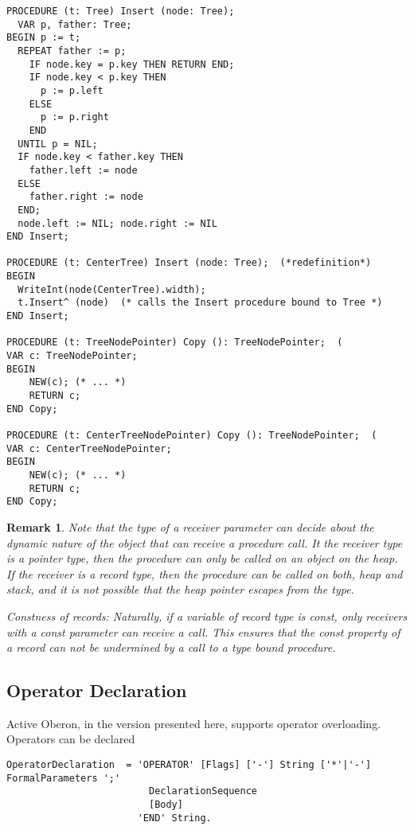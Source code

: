 \documentclass[a4wide,11pt]{article}
\newtheorem{remark}{Remark}
\begin{document}
\begin{annotation}
\begin{lstlisting}[style=example]
PROCEDURE (t: Tree) Insert (node: Tree);
  VAR p, father: Tree;
BEGIN p := t;
  REPEAT father := p;
    IF node.key = p.key THEN RETURN END;
    IF node.key < p.key THEN
      p := p.left
    ELSE
      p := p.right
    END
  UNTIL p = NIL;
  IF node.key < father.key THEN
    father.left := node
  ELSE
    father.right := node
  END;
  node.left := NIL; node.right := NIL
END Insert;

PROCEDURE (t: CenterTree) Insert (node: Tree);  (*redefinition*)
BEGIN
  WriteInt(node(CenterTree).width);
  t.Insert^ (node)  (* calls the Insert procedure bound to Tree *)
END Insert;

PROCEDURE (t: TreeNodePointer) Copy (): TreeNodePointer;  (
VAR c: TreeNodePointer;
BEGIN
	NEW(c); (* ... *)
	RETURN c;
END Copy;

PROCEDURE (t: CenterTreeNodePointer) Copy (): TreeNodePointer;  (
VAR c: CenterTreeNodePointer;
BEGIN
	NEW(c); (* ... *)
	RETURN c;
END Copy;

\end{lstlisting}

\begin{remark} Note that the type of a receiver parameter can decide about the dynamic nature of the object that can receive a procedure call.
It the receiver type is a pointer type, then the procedure can only be called on an object on the heap.
If the receiver is a record type, then the procedure can be called on both, heap and stack, and it is not possible that the heap pointer escapes from the type.

Constness of records: Naturally, if a variable of record type is const, only receivers with a const parameter can receive a call.
This ensures that the const property of a record can not be undermined by a call to a type bound procedure.
\end{remark}

\end{annotation}


\subsection{Operator Declaration}\label{subsection: Operator Declaration}

Active Oberon, in the version presented here, supports operator overloading. Operators can be declared 

\begin{lstlisting}[style=ebnf]
OperatorDeclaration  = 'OPERATOR' [Flags] ['-'] String ['*'|'-'] FormalParameters ';'
                         DeclarationSequence
                         [Body]
                       'END' String.
\end{lstlisting}
\end{document}
